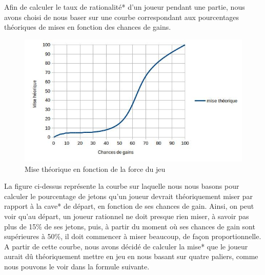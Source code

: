 \documentclass{report}
\begin{document}
\hspace{0.5cm}Afin de calculer le taux de rationalité* d'un joueur pendant une partie, nous avons choisi de nous baser sur une courbe correspondant aux pourcentages théoriques de mises en fonction des chances de gains. 

\begin{figure}[H]
	\begin{center}
		\includegraphics[scale=0.5]{./imagesRapport/courbeRationaliteMiseTheorique.jpg}
	\end{center}
	\caption[Mise théorique en fonction de la force du jeu]{Mise théorique en fonction de la force du jeu}
\end{figure}

La figure ci-dessus représente la courbe sur laquelle nous nous basons pour calculer le pourcentage de jetons qu'un joueur devrait théoriquement miser par rapport à la cave* de départ, en fonction de ses chances de gain. Ainsi, on peut voir qu'au départ, un joueur rationnel ne doit presque rien miser, à savoir pas plus de 15\% de ses jetons, puis, à partir du moment où ses chances de gain sont supérieures à 50\%, il doit commencer à miser beaucoup, de façon proportionnelle.\\

A partir de cette courbe, nous avons décidé de calculer la mise* que le joueur aurait dû théoriquement mettre en jeu en nous basant sur quatre paliers, comme nous pouvons le voir dans la formule suivante. \\
\end{document}
